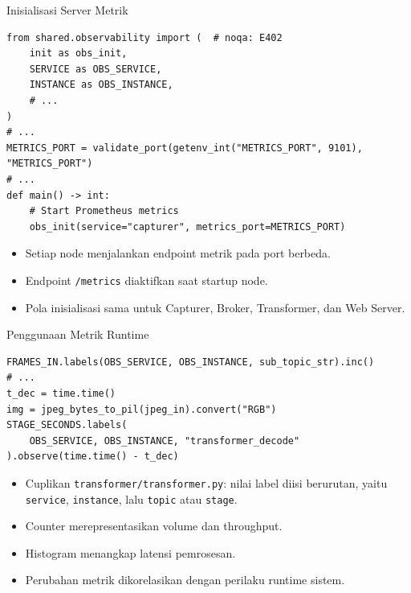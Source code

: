 \documentclass[aspectratio=169, table]{beamer}
\begin{document}
\begin{frame}[fragile]{Inisialisasi Server Metrik}
	\vspace{10pt}
	\begin{lstlisting}[style=PythonStyle, basicstyle=\ttfamily\scriptsize]
from shared.observability import (  # noqa: E402
    init as obs_init,
    SERVICE as OBS_SERVICE,
    INSTANCE as OBS_INSTANCE,
    # ...
)
# ...
METRICS_PORT = validate_port(getenv_int("METRICS_PORT", 9101), "METRICS_PORT")
# ...
def main() -> int:
    # Start Prometheus metrics
    obs_init(service="capturer", metrics_port=METRICS_PORT)
\end{lstlisting}

	\vspace{6pt}
	\begin{itemize}
		\item Setiap node menjalankan endpoint metrik pada port berbeda.
		\item Endpoint \texttt{/metrics} diaktifkan saat startup node.
		\item Pola inisialisasi sama untuk Capturer, Broker, Transformer, dan Web Server.
	\end{itemize}
\end{frame}

\begin{frame}[fragile]{Penggunaan Metrik Runtime}
	\vspace{20pt}
	\begin{lstlisting}[style=PythonStyle, basicstyle=\ttfamily\scriptsize]
FRAMES_IN.labels(OBS_SERVICE, OBS_INSTANCE, sub_topic_str).inc()
# ...
t_dec = time.time()
img = jpeg_bytes_to_pil(jpeg_in).convert("RGB")
STAGE_SECONDS.labels(
    OBS_SERVICE, OBS_INSTANCE, "transformer_decode"
).observe(time.time() - t_dec)
\end{lstlisting}

	\vspace{6pt}
	\begin{itemize}
		\item Cuplikan \texttt{transformer/transformer.py}: nilai label diisi berurutan, yaitu \texttt{service}, \texttt{instance}, lalu \texttt{topic} atau \texttt{stage}.
		\item Counter merepresentasikan volume dan throughput.
		\item Histogram menangkap latensi pemrosesan.
		\item Perubahan metrik dikorelasikan dengan perilaku runtime sistem.
	\end{itemize}
\end{frame}
\end{document}
